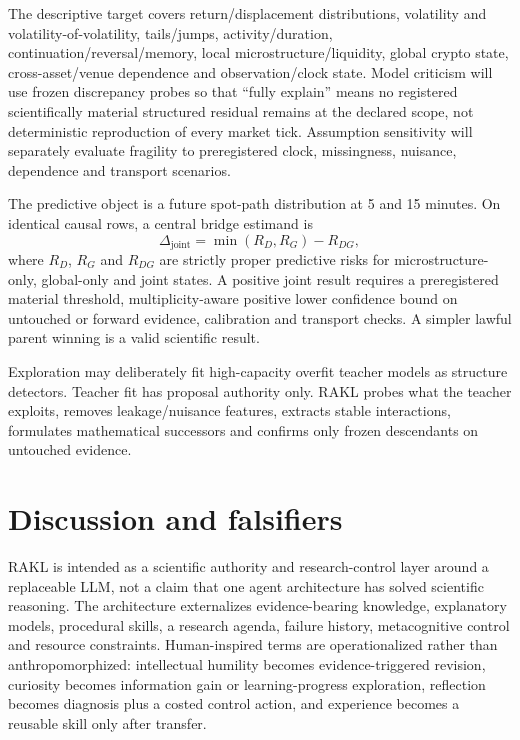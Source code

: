 \documentclass[11pt]{article}
\newcommand{\RAKL}{\textsc{RAKL}}
\begin{document}
The descriptive target covers return/displacement distributions, volatility and volatility-of-volatility, tails/jumps, activity/duration, continuation/reversal/memory, local microstructure/liquidity, global crypto state, cross-asset/venue dependence and observation/clock state. Model criticism will use frozen discrepancy probes so that ``fully explain'' means no registered scientifically material structured residual remains at the declared scope, not deterministic reproduction of every market tick. Assumption sensitivity will separately evaluate fragility to preregistered clock, missingness, nuisance, dependence and transport scenarios.

The predictive object is a future spot-path distribution at 5 and 15 minutes. On identical causal rows, a central bridge estimand is
\begin{equation}\Delta_{\mathrm{joint}}=\min(R_D,R_G)-R_{DG},\end{equation}
where $R_D$, $R_G$ and $R_{DG}$ are strictly proper predictive risks for microstructure-only, global-only and joint states. A positive joint result requires a preregistered material threshold, multiplicity-aware positive lower confidence bound on untouched or forward evidence, calibration and transport checks. A simpler lawful parent winning is a valid scientific result.

Exploration may deliberately fit high-capacity overfit teacher models as structure detectors. Teacher fit has proposal authority only. \RAKL{} probes what the teacher exploits, removes leakage/nuisance features, extracts stable interactions, formulates mathematical successors and confirms only frozen descendants on untouched evidence.

\section{Discussion and falsifiers}
\RAKL{} is intended as a scientific authority and research-control layer around a replaceable LLM, not a claim that one agent architecture has solved scientific reasoning. The architecture externalizes evidence-bearing knowledge, explanatory models, procedural skills, a research agenda, failure history, metacognitive control and resource constraints. Human-inspired terms are operationalized rather than anthropomorphized: intellectual humility becomes evidence-triggered revision, curiosity becomes information gain or learning-progress exploration, reflection becomes diagnosis plus a costed control action, and experience becomes a reusable skill only after transfer.
\end{document}
